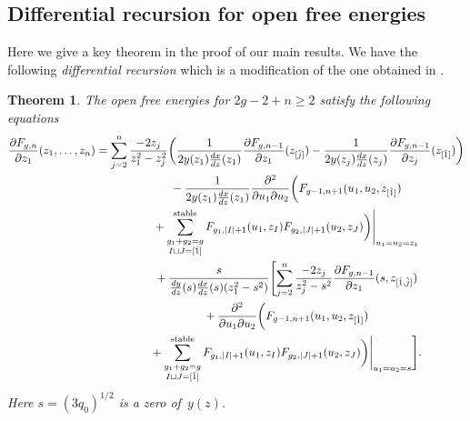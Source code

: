 \documentclass[pdftex]{sigma}
\newtheorem{thm}{Theorem}[section]
\theoremstyle{definition}
\numberwithin{equation}{section}
\def\p{\partial}
\begin{document}
\subsection{Dif\/ferential recursion for open free energies}

Here we give a key theorem in the proof of our main results.
We have the following {\em differential recursion} which is
a modif\/ication of the one obtained in \cite{DM14, DM14-2}.

\begin{thm} \label{thm:diff-rec}
The open free energies for $2g-2+n \ge 2$ satisfy
the following equations
\begin{gather}
\frac{\p F_{g,n}}{\p z_{1}}(z_{1},\dots,z_{n}) =
\sum_{j=2}^{n} \frac{-2z_{j}}{z_{1}^{2}-z_{j}^{2}}
\biggl( \frac{1}{2y(z_{1})\frac{dx}{dz}(z_{1})}
\frac{\p F_{g,n-1}}{\p z_{1}}(z_{[\hat{j}]})
 - \frac{1}{2y(z_{j})\frac{dx}{dz}(z_{j})}
\frac{\p F_{g,n-1}}{\p z_{j}}(z_{[\hat{1}]}) \biggr)
\nonumber\\
\hphantom{\frac{\p F_{g,n}}{\p z_{1}}(z_{1},\dots,z_{n}) =}{}
- \frac{1}{2y(z_{1})\frac{dx}{dz}(z_{1})} \frac{\p^{2}}{\p u_{1} \p u_{2}}
\biggl( F_{g-1,n+1}(u_{1},u_{2},z_{[\hat{1}]}) \nonumber\\
\hphantom{\frac{\p F_{g,n}}{\p z_{1}}(z_{1},\dots,z_{n}) =}{}
+
\sum_{\substack{g_{1}+g_{2}=g \\ I \sqcup J = [\hat{1}]}}^{\rm stable}
F_{g_{1}, |I|+1}(u_{1},z_{I}) F_{g_{2}, |J|+1}(u_{2}, z_{J})
\biggr)\Biggr|_{u_{1}=u_{2}=z_{1}}
\nonumber\\
\hphantom{\frac{\p F_{g,n}}{\p z_{1}}(z_{1},\dots,z_{n}) =}{}
+ \frac{s}{\frac{dy}{dz}(s) \frac{dx}{dz}(s)(z_{1}^{2}-s^{2})}
\Biggl[ \sum_{j=2}^{n} \frac{-2 z_{j}}{z_{j}^{2}-s^{2}}
\frac{\p F_{g,n-1}}{\p z_{1}}(s,z_{[\hat{1}, \hat{j}]})
\nonumber\\
\hphantom{\frac{\p F_{g,n}}{\p z_{1}}(z_{1},\dots,z_{n}) =}{}
+ \frac{\p^{2}}{\p u_{1} \p u_{2}}
\biggl( F_{g-1,n+1}(u_{1},u_{2},z_{[\hat{1}]})\nonumber\\
\hphantom{\frac{\p F_{g,n}}{\p z_{1}}(z_{1},\dots,z_{n}) =}{}
 +
\sum_{\substack{g_{1}+g_{2}=g \\
I \sqcup J = [\hat{1}]}}^{\rm stable}
F_{g_{1}, |I|+1}(u_{1},z_{I}) F_{g_{2}, |J|+1}(u_{2}, z_{J})
\biggr)\Biggr|_{u_{1}=u_{2}=s} \Biggr].\label{eq:diff-rec}
\end{gather}
Here
$s = (3q_{0})^{1/2}$
is a zero of~$y(z)$.
\end{thm}
\end{document}
